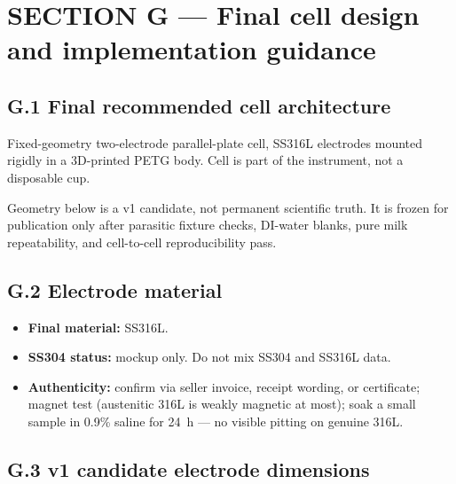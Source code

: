 \documentclass[11pt,a4paper]{article}
\begin{document}
\section{SECTION G --- Final cell design and implementation guidance}
\label{sec:G}

\subsection{G.1 Final recommended cell architecture}

Fixed-geometry two-electrode parallel-plate cell, SS316L electrodes mounted rigidly in a 3D-printed PETG body. Cell is part of the instrument, not a disposable cup.

\begin{openbox}
Geometry below is a v1 candidate, not permanent scientific truth. It is frozen for publication only after parasitic fixture checks, DI-water blanks, pure milk repeatability, and cell-to-cell reproducibility pass.
\end{openbox}

\subsection{G.2 Electrode material}

\begin{itemize}
\item \textbf{Final material:} SS316L.
\item \textbf{SS304 status:} mockup only. Do not mix SS304 and SS316L data.
\item \textbf{Authenticity:} confirm via seller invoice, receipt wording, or certificate; magnet test (austenitic 316L is weakly magnetic at most); soak a small sample in 0.9\% saline for 24~h --- no visible pitting on genuine 316L.
\end{itemize}

\subsection{G.3 v1 candidate electrode dimensions}
\end{document}
